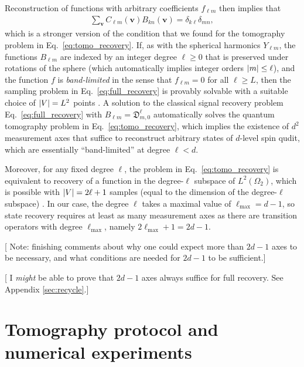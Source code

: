 \documentclass[nofootinbib,notitlepage,twocolumn]{revtex4-2}
\renewcommand{\t}{\text} %
\newcommand{\p}[1]{\left(#1\right)} %
\renewcommand{\v}{\bm} %
\newcommand{\1}{\mathds{1}}
\newcommand{\D}{\mathfrak{D}}
\newcommand{\red}[1]{{\color{red} #1}}
\begin{document}
Reconstruction of functions with arbitrary coefficients $f_{\ell m}$ then implies that
\begin{align}
  \sum_{\v v} C_{\ell m}\p{\v v} B_{kn}\p{\v v}
  = \delta_{k\ell} \delta_{mn},
  \label{eq:full_recovery}
\end{align}
which is a stronger version of the condition that we found for the tomography problem in Eq.~\eqref{eq:tomo_recovery}.
If, as with the spherical harmonics $Y_{\ell m}$, the functions $B_{\ell m}$ are indexed by an integer degree $\ell\ge0$ that is preserved under rotations of the sphere (which automatically implies integer orders $\abs{m}\le\ell$), and the function $f$ is {\it band-limited} in the sense that $f_{\ell m}=0$ for all $\ell\ge L$, then the sampling problem in Eq.~\eqref{eq:full_recovery} is provably solvable with a suitable choice of $\abs{V}=L^2$ points \cite{freeden2008spherical}.
A solution to the classical signal recovery problem Eq.~\eqref{eq:full_recovery} with $B_{\ell m}=\D^\ell_{m,0}$ automatically solves the quantum tomography problem in Eq.~\eqref{eq:tomo_recovery}, which implies the existence of $d^2$ measurement axes that suffice to reconstruct arbitrary states of $d$-level spin qudit, which are essentially ``band-limited'' at degree $\ell<d$.

Moreover, for any fixed degree $\ell$, the problem in Eq.~\eqref{eq:tomo_recovery} is equivalent to recovery of a function in the degree-$\ell$ subspace of $L^2\p{\Omega_2}$, which is possible with $\abs{V}=2\ell+1$ samples (equal to the dimension of the degree-$\ell$ subspace) \cite{freeden2008spherical}.
In our case, the degree $\ell$ takes a maximal value of $\ell_{\t{max}}=d-1$, so state recovery requires at least as many measurement axes as there are transition operators with degree $\ell_{\t{max}}$, namely $2\ell_{\t{max}}+1=2d-1$.

[\red{Note: finishing comments about why one could expect more than $2d-1$ axes to be necessary, and what conditions are needed for $2d-1$ to be sufficient.}]

[\red{I {\it might} be able to prove that $2d-1$ axes always suffice for full recovery.
  See Appendix \ref{sec:recycle}.}]

\vspace{3cm}

\section{Tomography protocol and numerical experiments}
\end{document}

